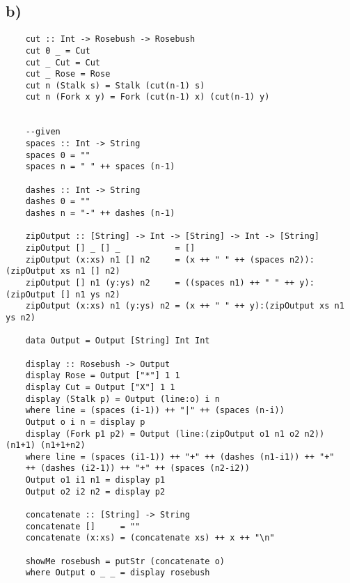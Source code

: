 \documentclass[a4paper]{article}
\begin{document}
\subsection*{b)}
\begin{lstlisting}
	cut :: Int -> Rosebush -> Rosebush
	cut 0 _ = Cut
	cut _ Cut = Cut
	cut _ Rose = Rose
	cut n (Stalk s) = Stalk (cut(n-1) s)
	cut n (Fork x y) = Fork (cut(n-1) x) (cut(n-1) y)
	
	
	--given
	spaces :: Int -> String
	spaces 0 = ""
	spaces n = " " ++ spaces (n-1)
	
	dashes :: Int -> String
	dashes 0 = ""
	dashes n = "-" ++ dashes (n-1)
	
	zipOutput :: [String] -> Int -> [String] -> Int -> [String]
	zipOutput [] _ [] _           = []
	zipOutput (x:xs) n1 [] n2     = (x ++ " " ++ (spaces n2)):(zipOutput xs n1 [] n2)
	zipOutput [] n1 (y:ys) n2     = ((spaces n1) ++ " " ++ y):(zipOutput [] n1 ys n2)
	zipOutput (x:xs) n1 (y:ys) n2 = (x ++ " " ++ y):(zipOutput xs n1 ys n2)
	
	data Output = Output [String] Int Int
	
	display :: Rosebush -> Output
	display Rose = Output ["*"] 1 1
	display Cut = Output ["X"] 1 1
	display (Stalk p) = Output (line:o) i n
	where line = (spaces (i-1)) ++ "|" ++ (spaces (n-i))
	Output o i n = display p
	display (Fork p1 p2) = Output (line:(zipOutput o1 n1 o2 n2)) (n1+1) (n1+1+n2)
	where line = (spaces (i1-1)) ++ "+" ++ (dashes (n1-i1)) ++ "+"
	++ (dashes (i2-1)) ++ "+" ++ (spaces (n2-i2))
	Output o1 i1 n1 = display p1
	Output o2 i2 n2 = display p2
	
	concatenate :: [String] -> String
	concatenate []     = ""
	concatenate (x:xs) = (concatenate xs) ++ x ++ "\n"
	
	showMe rosebush = putStr (concatenate o)
	where Output o _ _ = display rosebush
\end{lstlisting}
\end{document}
